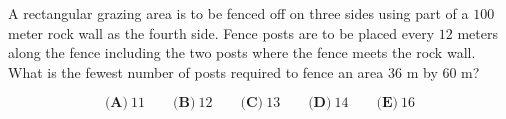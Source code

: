 

A rectangular grazing area is to be fenced off on three sides using part of a $ 100$ meter rock wall as the fourth side. Fence posts are to be placed every $ 12$ meters along the fence including the two posts where the fence meets the rock wall. What is the fewest number of posts required to fence an area $ 36$ m by $ 60$ m?

\[ \textbf{(A)}\ 11 \qquad
\textbf{(B)}\ 12 \qquad
\textbf{(C)}\ 13 \qquad
\textbf{(D)}\ 14 \qquad
\textbf{(E)}\ 16
\]
